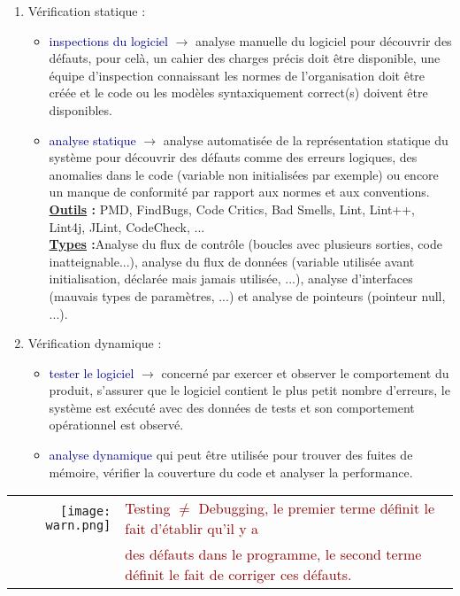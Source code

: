 \documentclass{article}
\newcommand{\blu}[1]{\textcolor{darkblue}{#1}}
\newcommand{\ora}[1]{\textcolor{darko}{#1}}
\newcommand{\rouge}[1]{\textcolor{darkred}{#1}}
\begin{document}
\begin{sffamily}
\begin{enumerate}
\item \ora{Vérification statique} :
	\begin{itemize}
	\item \blu{inspections du logiciel} $\rightarrow$ analyse manuelle du logiciel pour découvrir des défauts, pour celà, un 
	cahier des charges précis doit être disponible, une équipe d'inspection connaissant les normes de l'organisation doit être 
	créée et le code ou les modèles syntaxiquement correct(s) doivent être disponibles.
	\item \blu{analyse statique} $\rightarrow$ analyse automatisée de la représentation statique du système pour découvrir des
	défauts comme des erreurs logiques, des anomalies dans le code (variable non initialisées par exemple) ou encore un manque
	de conformité par rapport aux normes et aux conventions. \\
	\textbf{\underline{Outils} : }PMD, FindBugs, Code Critics, Bad Smells, Lint, Lint++, Lint4j, JLint, CodeCheck, ...\\
	\textbf{\underline{Types} :}Analyse du flux de contrôle (boucles avec plusieurs sorties, code inatteignable...), analyse du 
	flux de données (variable utilisée avant initialisation, déclarée mais jamais utilisée, ...), analyse d'interfaces (mauvais 
	types de paramètres, ...) et analyse de pointeurs (pointeur null, ...).
	\end{itemize}
	\newpage
\item \ora{Vérification dynamique} :
	\begin{itemize}
	\item \blu{tester le logiciel} $\rightarrow$ concerné par exercer et observer le comportement du produit, s'assurer que le 
	logiciel contient le plus petit nombre d'erreurs, le système est exécuté avec des données de tests et son comportement 
	opérationnel est observé.
	\item \blu{analyse dynamique} qui peut être utilisée pour trouver des fuites de mémoire, vérifier la couverture du code et 
	analyser la performance.
	\end{itemize}
\end{enumerate}

\begin{center}
\begin{tabular}{rl}

\texttt{[image: warn.png]} & \rouge{Testing $\neq$ Debugging, le premier terme définit le fait d'établir qu'il y a} 
\\& \rouge{des défauts dans le programme, le second terme définit le fait de corriger ces 
défauts.}
\end{tabular}
\end{center}


\end{sffamily}
\end{document}
